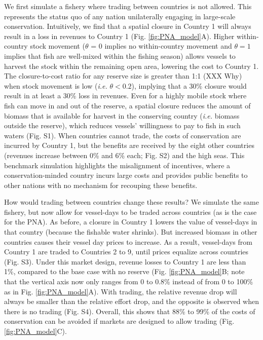 \documentclass[12pt]{article}
\begin{document}
We first simulate a fishery where trading between countries is not allowed. This represents the status quo of any nation unilaterally engaging in large-scale conservation. Intuitively, we find that a spatial closure in Country 1 will always result in a loss in revenues to Country 1 (Fig. \ref{fig:PNA_model}A). Higher within-country stock movement ($\theta$ = 0 implies no within-country movement and $\theta = 1$ implies that fish are well-mixed within the fishing season) allows vessels to harvest the stock within the remaining open area, lowering the cost to Country 1. The closure-to-cost ratio for any reserve size is greater than 1:1 (XXX Why) when stock movement is low (\emph{i.e.} $\theta < 0.2$), implying that a 30\% closure would result in at least a 30\% loss in revenues. Even for a highly mobile stock where fish can move in and out of the reserve, a spatial closure reduces the amount of biomass that is available for harvest in the conserving country (\emph{i.e.} biomass outside the reserve), which reduces vessels' willingness to pay to fish in such waters (Fig. S1). When countries cannot trade, the costs of conservation are incurred by Country 1, but the benefits are received by the eight other countries (revenues increase between 0\% and 6\% each; Fig. S2) and the high seas. This benchmark simulation highlights the misalignment of incentives, where a conservation-minded country incurs large costs and provides public benefits to other nations with no mechanism for recouping these benefits.

How would trading between countries change these results? We simulate the same fishery, but now allow for vessel-days to be traded across countries (as is the case for the PNA). As before, a closure in Country 1 lowers the value of vessel-days in that country (because the fishable water shrinks). But increased biomass in other countries causes their vessel day prices to increase. As a result, vessel-days from Country 1 are traded to Countries 2 to 9, until prices equalize across countries (Fig. S3). Under this market design, revenue losses to Country 1 are less than 1\%, compared to the base case with no reserve (Fig. \ref{fig:PNA_model}B; note that the vertical axis now only ranges from 0 to 0.8\% instead of from 0 to 100\% as in Fig. \ref{fig:PNA_model}A). With trading, the relative revenue drop will always be smaller than the relative effort drop, and the opposite is observed when there is no trading (Fig. S4). Overall, this shows that 88\% to 99\% of the costs of conservation can be avoided if markets are designed to allow trading (Fig. \ref{fig:PNA_model}C).
\end{document}
